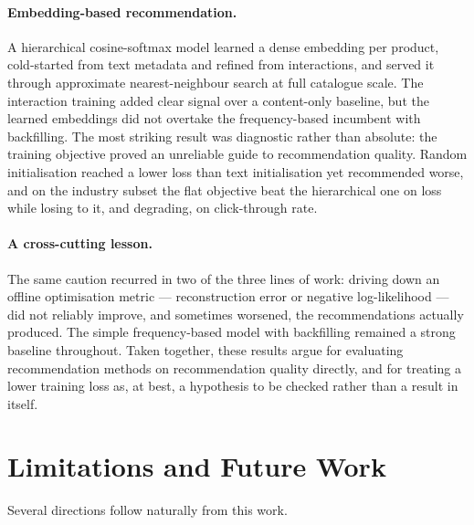 \paragraph{Embedding-based recommendation.}
A hierarchical cosine-softmax model learned a dense embedding per product,
cold-started from text metadata and refined from interactions, and served it
through approximate nearest-neighbour search at full catalogue scale. The
interaction training added clear signal over a content-only baseline, but the
learned embeddings did not overtake the frequency-based incumbent with
backfilling. The most striking result was diagnostic rather than absolute: the
training objective proved an unreliable guide to recommendation quality. Random
initialisation reached a lower loss than text initialisation yet recommended
worse, and on the industry subset the flat objective beat the hierarchical one on
loss while losing to it, and degrading, on click-through rate.

\paragraph{A cross-cutting lesson.}
The same caution recurred in two of the three lines of work: driving down an
offline optimisation metric --- reconstruction error or negative log-likelihood
--- did not reliably improve, and sometimes worsened, the recommendations
actually produced. The simple frequency-based model with backfilling remained a
strong baseline throughout. Taken together, these results argue for evaluating
recommendation methods on recommendation quality directly, and for treating a
lower training loss as, at best, a hypothesis to be checked rather than a result
in itself.

\section{Limitations and Future Work}
\label{sec:concl-future}

Several directions follow naturally from this work.

